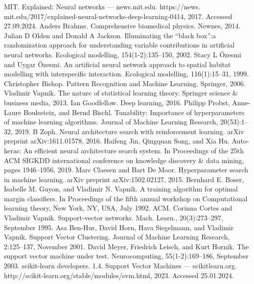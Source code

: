 \documentclass[preprint,12pt]{elsarticle}
\begin{document}
\begin{thebibliography}{000}
 MIT. Explained: Neural networks — news.mit.edu. https://news. mit.edu/2017/explained-neural-networks-deep-learning-0414, 2017. Accessed 27.09.2024. 
 Anders Brahme. Comprehensive biomedical physics. Newnes, 2014. 
 Julian D Olden and Donald A Jackson. Illuminating the “black box”:a randomization approach for understanding variable contributions in artificial neural networks. Ecological modelling, 154(1-2):135–150, 2002. 
 Stacy L Özesmi and Uygar Özesmi. An artificial neural network approach to spatial habitat modelling with interspecific interaction. Ecological modelling, 116(1):15–31, 1999. 
 Christopher Bishop. Pattern Recognition and Machine Learning. Springer, 2006. 
 Vladimir Vapnik. The nature of statistical learning theory. Springer science & business media, 2013. 
 Ian Goodfellow. Deep learning, 2016. 
 Philipp Probst, Anne-Laure Boulesteix, and Bernd Bischl. Tunability: Importance of hyperparameters of machine learning algorithms. Journal of Machine Learning Research, 20(53):1–32, 2019. 
 B Zoph. Neural architecture search with reinforcement learning. arXiv preprint arXiv:1611.01578, 2016. 
 Haifeng Jin, Qingquan Song, and Xia Hu. Auto-keras: An efficient neural architecture search system. In Proceedings of the 25th ACM SIGKDD international conference on knowledge discovery & data mining, pages 1946–1956, 2019. 
 Marc Claesen and Bart De Moor. Hyperparameter search in machine learning. arXiv preprint arXiv:1502.02127, 2015. 
 Bernhard E. Boser, Isabelle M. Guyon, and Vladimir N. Vapnik. A training algorithm for optimal margin classifiers. In Proceedings of the fifth annual workshop on Computational learning theory, New York, NY, USA, July 1992. ACM. 
 Corinna Cortes and Vladimir Vapnik. Support-vector networks. Mach. Learn., 20(3):273–297, September 1995. 
 Asa Ben-Hur, David Horn, Hava Siegelmann, and Vladimir Vapnik. Support Vector Clustering. Journal of Machine Learning Research, 2:125–137, November 2001. 
 David Meyer, Friedrich Leisch, and Kurt Hornik. The support vector machine under test. Neurocomputing, 55(1-2):169–186, September 2003. 
 scikit-learn developers. 1.4. Support Vector Machines — scikitlearn.org. http://scikit-learn.org/stable/modules/svm.html, 2023. Accessed 25.01.2024. 

\end{thebibliography}
\end{document}
